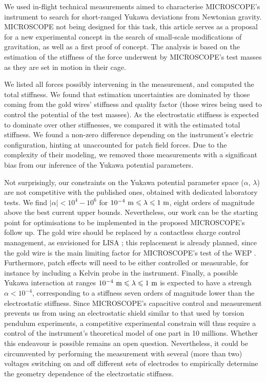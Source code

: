 \documentclass[12pt]{iopart}
\begin{document}
We used in-flight technical measurements aimed to characterise MICROSCOPE's instrument to search for short-ranged Yukawa deviations from Newtonian gravity. MICROSCOPE not being designed for this task, this article serves as a proposal for a new experimental concept in the search of small-scale modifications of gravitation, as well as a first proof of concept. The analysis is based on the estimation of the stiffness of the force underwent by MICROSCOPE's test masses as they are set in motion in their cage. 

We listed all forces possibly intervening in the measurement, and computed the total stiffness. We found that estimation uncertainties are dominated by those coming from the gold wires' stiffness and quality factor (those wires being used to control the potential of the test masses).
As the electrostatic stiffness is expected to dominate over other stiffnesses, we compared it with the estimated total stiffness. We found a non-zero difference depending on the instrument's electric configuration, hinting at unaccounted for patch field forces. Due to the complexity of their modeling, we removed those measurements with a significant bias from our inference of the Yukawa potential parameters.

Not surprisingly, our constraints on the Yukawa potential parameter space ($\alpha$, $\lambda$) are not competitive with the published ones, obtained with dedicated laboratory tests. We find $|\alpha| < 10^4-10^6$ for $10^{-4}~{\rm m} \leqslant \lambda \leqslant 1~{\rm m}$, eight orders of magnitude above the best current upper bounds. Nevertheless, our work can be the starting point for optimisations to be implemented in the proposed MICROSCOPE's follow up. The gold wire should be replaced by a contactless charge control management, as envisioned for LISA \cite{sumner09, armano18}; this replacement is already planned, since the gold wire is the main limiting factor for MICROSCOPE's test of the WEP \cite{touboul17, touboul19}. Furthermore, patch effects will need to be either controlled or measurable, for instance by including a Kelvin probe in the instrument.
Finally, a possible Yukawa interaction at ranges $10^{-4}~{\rm m} \leqslant \lambda \leqslant 1~{\rm m}$ is expected to have a strengh $\alpha<10^{-4}$, corresponding to a stiffness seven orders of magnitude lower than the electrostatic stiffness. Since MICROSCOPE's capacitive control and measurement prevents us from using an electrostatic shield similar to that used by torsion pendulum experiments, a competitive experimental constrain will thus require a control of the instrument's theoretical model of one part in 10 millions. Whether this endeavour is possible remains an open question. Nevertheless, it could be circumvented by performing the measurement with several (more than two) voltages switching on and off different sets of electrodes to empirically determine the geometry dependence of the electrostatic stiffness.
\end{document}
